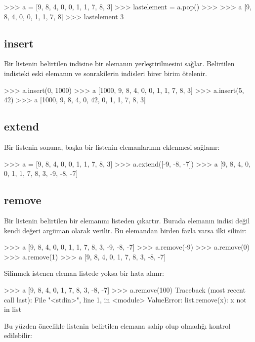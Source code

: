 \documentclass[12pt]{report}
\begin{document}
\begin{python}
>>> a = [9, 8, 4, 0, 0, 1, 1, 7, 8, 3]
>>> lastelement = a.pop()
>>> 
>>> a
[9, 8, 4, 0, 0, 1, 1, 7, 8]
>>> lastelement
3
\end{python}

\subsection{insert}
Bir listenin belirtilen indisine bir elemanın yerleştirilmesini sağlar. Belirtilen indisteki eski elemanın ve sonrakilerin indisleri birer birim ötelenir. 

\begin{python}
>>> a.insert(0, 1000)
>>> a
[1000, 9, 8, 4, 0, 0, 1, 1, 7, 8, 3]
>>> a.insert(5, 42)
>>> a
[1000, 9, 8, 4, 0, 42, 0, 1, 1, 7, 8, 3]
\end{python}

\subsection{extend}
Bir listenin sonuna, başka bir listenin elemanlarının eklenmesi sağlanır:

\begin{python}
>>> a = [9, 8, 4, 0, 0, 1, 1, 7, 8, 3]
>>> a.extend([-9, -8, -7])
>>> a
[9, 8, 4, 0, 0, 1, 1, 7, 8, 3, -9, -8, -7]
\end{python}

\subsection{remove}
Bir listenin belirtilen bir elemanını listeden çıkartır. Burada elemanın indisi değil kendi değeri argüman olarak verilir. Bu elemandan birden fazla varsa ilki silinir:

\begin{python}
>>> a
[9, 8, 4, 0, 0, 1, 1, 7, 8, 3, -9, -8, -7]
>>> a.remove(-9)
>>> a.remove(0)
>>> a.remove(1)
>>> a
[9, 8, 4, 0, 1, 7, 8, 3, -8, -7]
\end{python}

Silinmek istenen eleman listede yoksa bir hata alınır:

\begin{python}
>>> a
[9, 8, 4, 0, 1, 7, 8, 3, -8, -7]
>>> a.remove(100)
Traceback (most recent call last):
File "<stdin>", line 1, in <module>
ValueError: list.remove(x): x not in list
\end{python}

Bu yüzden öncelikle listenin belirtilen elemana sahip olup olmadığı kontrol edilebilir:
\end{document}
